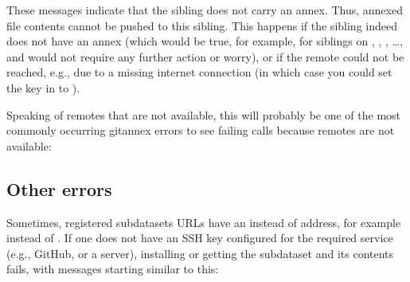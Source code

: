 \sphinxAtStartPar
These messages indicate that the sibling  does not carry an annex.
Thus, annexed file contents cannot be pushed to this sibling. This happens
if the sibling indeed does not have an annex (which would be true, for example,
for siblings on {\hyperref[\detokenize{glossary:term-GitHub}]{}}, {\hyperref[\detokenize{glossary:term-GitLab}]{}}, {\hyperref[\detokenize{glossary:term-Bitbucket}]{}}, …, and
would not require any further action or worry), or
if the remote could not be reached, e.g., due to a missing internet
connection (in which case you could set the key  in
 to ).

\sphinxAtStartPar
Speaking of remotes that are not available, this will probably be one of the most
commonly occurring git\sphinxhyphen{}annex errors to see \sphinxhyphen{} failing  calls
because remotes are not available:


\subsection{Other errors}
\label{\detokenize{basics/101-135-help:other-errors}}
\sphinxAtStartPar
Sometimes, registered subdatasets URLs have an {\hyperref[\detokenize{glossary:term-SSH}]{}} instead of {\hyperref[\detokenize{glossary:term-https}]{}} address, for example  instead of .
If one does not have an SSH key configured for the required service (e.g., GitHub, or a server), installing or getting the subdataset and its contents fails, with messages starting similar to this:

\begin{sphinxVerbatim}[commandchars=\\\{\}]
\end{sphinxVerbatim}

